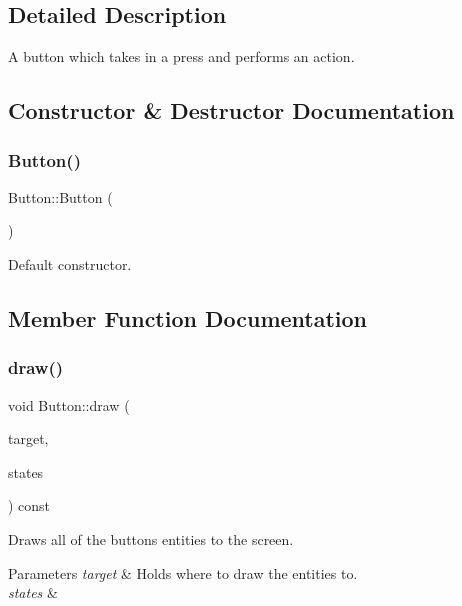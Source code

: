 \subsection{Detailed Description}
A button which takes in a press and performs an action. 

\subsection{Constructor \& Destructor Documentation}
\mbox{\label{class_button_a3b36df1ae23c58aedb9e15a713159459}} 
\subsubsection{\texorpdfstring{Button()}{Button()}}
{\footnotesize\ttfamily Button\+::\+Button (\begin{DoxyParamCaption}{ }\end{DoxyParamCaption})}



Default constructor. 



\subsection{Member Function Documentation}
\mbox{\label{class_button_a13280eb9f2786fd2597fd3b9c9c5c858}} 
\subsubsection{\texorpdfstring{draw()}{draw()}}
{\footnotesize\ttfamily void Button\+::draw (\begin{DoxyParamCaption}\item[{sf\+::\+Render\+Target \&}]{target,  }\item[{sf\+::\+Render\+States}]{states }\end{DoxyParamCaption}) const\hspace{0.3cm}{\ttfamily [private]}}



Draws all of the button\textquotesingle{}s entities to the screen. 


\begin{DoxyParams}{Parameters}
{\em target} & Holds where to draw the entities to. \\
\hline
{\em states} & \\
\hline
\end{DoxyParams}
\mbox{\label{class_button_ad29329cbec9b053165ffe043e30900ea}} 
